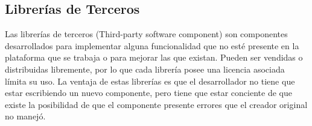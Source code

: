 \subsection{Librerías de Terceros}

Las librerías de terceros (Third-party software component) son componentes
desarrollados para implementar alguna funcionalidad que no esté presente
en la plataforma que se trabaja o para mejorar las que existan. Pueden
ser vendidas o distribuidas libremente, por lo que cada librería posee
una licencia asociada límita su uso. La ventaja de estas librerías
es que el desarrollador no tiene que estar escribiendo un nuevo componente,
pero tiene que estar conciente de que existe la posibilidad de que
el componente presente errores que el creador original no manejó.
